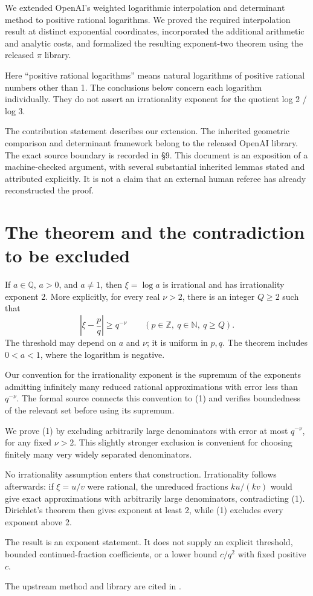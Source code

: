 We extended OpenAI's weighted logarithmic interpolation and determinant method to positive rational logarithms. We proved the required interpolation result at distinct exponential coordinates, incorporated the additional arithmetic and analytic costs, and formalized the resulting exponent-two theorem using the released \(\pi\) library.

Here ``positive rational logarithms'' means natural logarithms of positive rational numbers other than 1. The conclusions below concern each logarithm individually. They do not assert an irrationality exponent for the quotient log 2 / log 3.

The contribution statement describes our extension. The inherited geometric comparison and determinant framework belong to the released OpenAI library. The exact source boundary is recorded in §9. This document is an exposition of a machine-checked argument, with several substantial inherited lemmas stated and attributed explicitly. It is not a claim that an external human referee has already reconstructed the proof.

\section{The theorem and the contradiction to be excluded}

\begin{theorem} If \(a\in\mathbb Q\), \(a>0\), and \(a\ne1\), then \(\xi=\log a\) is irrational and has irrationality exponent 2. More explicitly, for every real \(\nu>2\), there is an integer \(Q\ge2\) such that
\[
\left|\xi-\frac pq\right|\ge q^{-\nu}
\qquad(p\in\mathbb Z,\ q\in\mathbb N,\ q\ge Q).
\tag{1}
\]
The threshold may depend on \(a\) and \(\nu\); it is uniform in \(p,q\). The theorem includes \(0<a<1\), where the logarithm is negative.
\end{theorem}

Our convention for the irrationality exponent is the supremum of the exponents admitting infinitely many reduced rational approximations with error less than \(q^{-\nu}\). The formal source connects this convention to (1) and verifies boundedness of the relevant set before using its supremum.

We prove (1) by excluding arbitrarily large denominators with error at most \(q^{-\nu}\), for any fixed \(\nu>2\). This slightly stronger exclusion is convenient for choosing finitely many very widely separated denominators.

No irrationality assumption enters that construction. Irrationality follows afterwards: if \(\xi=u/v\) were rational, the unreduced fractions \(ku/(kv)\) would give exact approximations with arbitrarily large denominators, contradicting (1). Dirichlet's theorem then gives exponent at least 2, while (1) excludes every exponent above 2.

The result is an exponent statement. It does not supply an explicit threshold, bounded continued-fraction coefficients, or a lower bound \(c/q^2\) with fixed positive \(c\).

The upstream method and library are cited in \citep{openai2026pi}.
